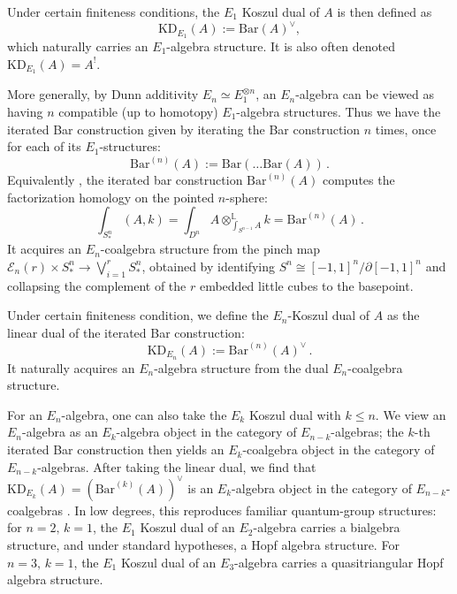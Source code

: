\documentclass[11pt]{article}
\numberwithin{equation}{section}
\begin{document}
Under certain finiteness conditions, the $E_1$ Koszul dual of $A$ is then defined as
\begin{equation}
	\mathrm{KD}_{E_1}(A) := \mathrm{Bar}(A)^{\vee},
\end{equation}
which naturally carries an $E_1$-algebra structure. It is also often denoted $\mathrm{KD}_{E_1}(A) = A^!$.

More generally, by Dunn additivity $E_n \simeq E_1^{\otimes n}$, an $E_n$-algebra can be viewed as having $n$ compatible (up to homotopy) $E_1$-algebra structures. Thus we have the iterated Bar construction given by iterating the Bar construction $n$ times, once for each of its $E_1$-structures:
\begin{equation}
	 \mathrm{Bar}^{(n)}(A) := \mathrm{Bar}(\dots \mathrm{Bar}(A))\,.
\end{equation}
Equivalently \cite{Ayala_Francis_2021,lurie2017higher}, the iterated bar construction $\mathrm{Bar}^{(n)}(A)$ computes the factorization homology on the pointed $n$-sphere:
\begin{equation}
	\int_{S^n_*} (A,k) = \int_{D^n}A\otimes_{\int_{S^{n-1}}\!\!A}^{\mathbb{L}}k = \mathrm{Bar}^{(n)}(A)\,.
\end{equation}
It acquires an $E_n$-coalgebra structure from the pinch map $\mathcal{E}_n(r)\times S^n_* \to \bigvee_{i = 1}^rS^n_*$, obtained by identifying $S^n \cong [-1,1]^n/\partial [-1,1]^n$ and collapsing the complement of the $r$ embedded little cubes to the basepoint. 

Under certain finiteness condition, we define the $E_n$-Koszul dual of $A$ as the linear dual of the iterated Bar construction:
\begin{equation}
	\mathrm{KD}_{E_n}(A) := \mathrm{Bar}^{(n)}(A)^{\vee}\,.
\end{equation}
It naturally acquires an $E_n$-algebra structure from the dual $E_n$-coalgebra structure. 


For an $E_n$-algebra, one can also take the $E_k$ Koszul dual with $k\leq n$. We view an $E_n$-algebra as an $E_k$-algebra object in the category of $E_{n-k}$-algebras; the $k$-th iterated Bar construction then yields an $E_k$-coalgebra object in the category of $E_{n-k}$-algebras. After taking the linear dual, we find that $\mathrm{KD}_{E_k}(A) = (\mathrm{Bar}^{(k)}(A))^{\vee}$ is an $E_k$-algebra object in the category of $E_{n-k}$-coalgebras \cite{ginot2012higher}. In low degrees, this reproduces familiar quantum-group structures: for $n = 2,\, k=1$, the $E_1$ Koszul dual of an $E_2$-algebra carries a bialgebra structure, and under standard hypotheses, a Hopf algebra structure. For $n = 3,\, k=1$, the $E_1$ Koszul dual of an $E_3$-algebra carries a quasitriangular Hopf algebra structure.
\end{document}
